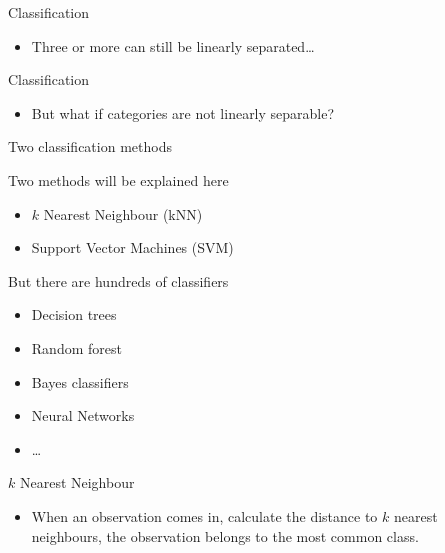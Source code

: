 \documentclass[compress]{beamer}
\begin{document}
\begin{frame}{Classification}

\begin{itemize}

\item
  Three or more can still be linearly separated\ldots{}
\end{itemize}

\end{frame}

\begin{frame}{Classification}

\begin{itemize}

\item
  But what if categories are not linearly separable?
\end{itemize}

\end{frame}

\begin{frame}{Two classification methods}

Two methods will be explained here

\begin{itemize}

\item
  \(k\) Nearest Neighbour (kNN)
\item
  Support Vector Machines (SVM)
\end{itemize}

But there are hundreds of classifiers

\begin{itemize}

\item
  Decision trees
\item
  Random forest
\item
  Bayes classifiers
\item
  Neural Networks
\item
  \ldots{}
\end{itemize}

\end{frame}

\begin{frame}{\(k\) Nearest Neighbour}

\begin{itemize}

\item
  When an observation comes in, calculate the distance to \(k\) nearest
  neighbours, the observation belongs to the most common class.
\end{itemize}

\end{frame}
\end{document}
